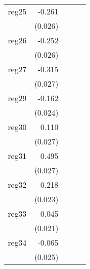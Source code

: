 {\begin{longtable}{l*{4}{D{.}{.}{-1}}}
\addlinespace
reg25       &      -0.261\sym{***}&                     &                     &                     \\
            &     (0.026)         &                     &                     &                     \\
\addlinespace
reg26       &      -0.252\sym{***}&                     &                     &                     \\
            &     (0.026)         &                     &                     &                     \\
\addlinespace
reg27       &      -0.315\sym{***}&                     &                     &                     \\
            &     (0.027)         &                     &                     &                     \\
\addlinespace
reg29       &      -0.162\sym{***}&                     &                     &                     \\
            &     (0.024)         &                     &                     &                     \\
\addlinespace
reg30       &       0.110\sym{***}&                     &                     &                     \\
            &     (0.027)         &                     &                     &                     \\
\addlinespace
reg31       &       0.495\sym{***}&                     &                     &                     \\
            &     (0.027)         &                     &                     &                     \\
\addlinespace
reg32       &       0.218\sym{***}&                     &                     &                     \\
            &     (0.023)         &                     &                     &                     \\
\addlinespace
reg33       &       0.045\sym{*}  &                     &                     &                     \\
            &     (0.021)         &                     &                     &                     \\
\addlinespace
reg34       &      -0.065\sym{**} &                     &                     &                     \\
            &     (0.025)         &                     &                     &                     \\

\end{longtable}}
